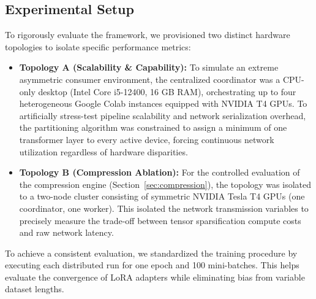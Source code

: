 \documentclass{ieeeaccess}
\begin{document}
\subsection{Experimental Setup}
To rigorously evaluate the framework, we provisioned two distinct hardware topologies to isolate specific performance metrics:
\begin{itemize}
    \item \textbf{Topology A (Scalability \& Capability):} To simulate an extreme asymmetric consumer environment, the centralized coordinator was a CPU-only desktop (Intel Core i5-12400, 16 GB RAM), orchestrating up to four heterogeneous Google Colab instances equipped with NVIDIA T4 GPUs. To artificially stress-test pipeline scalability and network serialization overhead, the partitioning algorithm was constrained to assign a minimum of one transformer layer to every active device, forcing continuous network utilization regardless of hardware disparities.
    \item \textbf{Topology B (Compression Ablation):} For the controlled evaluation of the compression engine (Section~\ref{sec:compression}), the topology was isolated to a two-node cluster consisting of symmetric NVIDIA Tesla T4 GPUs (one coordinator, one worker). This isolated the network transmission variables to precisely measure the trade-off between tensor sparsification compute costs and raw network latency.
\end{itemize}

To achieve a consistent evaluation, we standardized the training procedure by executing each distributed run for one epoch and 100 mini-batches. This helps evaluate the convergence of LoRA adapters while eliminating bias from variable dataset lengths.
\end{document}
